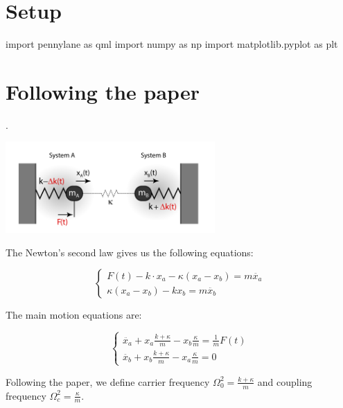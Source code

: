 \section{Setup}


\begin{python}
import pennylane as qml
import numpy as np
import matplotlib.pyplot as plt
\end{python}

\newpage

\section{Following the paper}

.

\begin{center}
  \includegraphics[width=0.6\textwidth]{img/osc.png}
\end{center}

The Newton's second law gives us the following equations:

\[
\begin{cases}
  \displaystyle F(t) - k \cdot x_a - \kappa(x_a - x_b) = m \ddot{x_a} \\
  \displaystyle \kappa(x_a - x_b) - k x_b = m \ddot{x_b}
\end{cases}
\]

The main motion equations are:

\[
\begin{cases}
  \displaystyle \ddot{x_a} + x_a\frac{k + \kappa}{m} - x_b\frac{\kappa}{m} = \frac{1}{m}F(t) \\
  \displaystyle \ddot{x_b} + x_b\frac{k + \kappa}{m} - x_a\frac{\kappa}{m} = 0
\end{cases}
\]

Following the paper, we define carrier frequency $\Omega_0^2 = \frac{k+\kappa}{m}$ and coupling
frequency $\Omega_c^2 = \frac{\kappa}{m}$.

